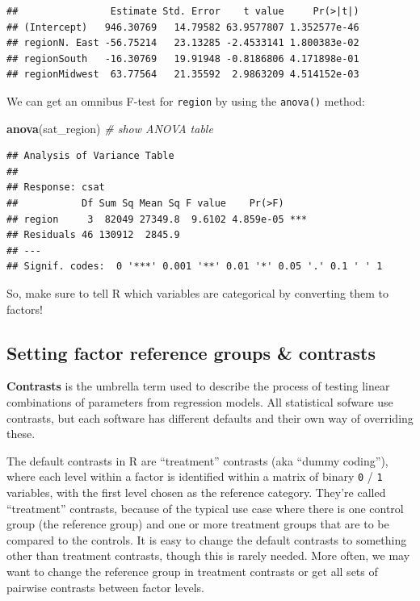 \documentclass[
]{book}
\newenvironment{Shaded}{\begin{snugshade}}{\end{snugshade}}
\newcommand{\CommentTok}[1]{\textcolor[rgb]{0.56,0.35,0.01}{\textit{#1}}}
\newcommand{\KeywordTok}[1]{\textcolor[rgb]{0.13,0.29,0.53}{\textbf{#1}}}
\newcommand{\NormalTok}[1]{#1}
\begin{document}
\begin{verbatim}
##                Estimate Std. Error    t value     Pr(>|t|)
## (Intercept)   946.30769   14.79582 63.9577807 1.352577e-46
## regionN. East -56.75214   23.13285 -2.4533141 1.800383e-02
## regionSouth   -16.30769   19.91948 -0.8186806 4.171898e-01
## regionMidwest  63.77564   21.35592  2.9863209 4.514152e-03
\end{verbatim}

We can get an omnibus F-test for \texttt{region} by using the \texttt{anova()} method:

\begin{Shaded}
\begin{Highlighting}[]
  \KeywordTok{anova}\NormalTok{(sat\_region) }\CommentTok{\# show ANOVA table}
\end{Highlighting}
\end{Shaded}

\begin{verbatim}
## Analysis of Variance Table
## 
## Response: csat
##           Df Sum Sq Mean Sq F value    Pr(>F)    
## region     3  82049 27349.8  9.6102 4.859e-05 ***
## Residuals 46 130912  2845.9                      
## ---
## Signif. codes:  0 '***' 0.001 '**' 0.01 '*' 0.05 '.' 0.1 ' ' 1
\end{verbatim}

So, make sure to tell R which variables are categorical by converting them to factors!

\hypertarget{setting-factor-reference-groups-contrasts}{%
\subsection{Setting factor reference groups \& contrasts}\label{setting-factor-reference-groups-contrasts}}

\textbf{Contrasts} is the umbrella term used to describe the process of testing linear combinations of parameters from regression models. All statistical sofware use contrasts, but each software has different defaults and their own way of overriding these.

The default contrasts in R are ``treatment'' contrasts (aka ``dummy coding''), where each level within a factor is identified within a matrix of binary \texttt{0} / \texttt{1} variables, with the first level chosen as the reference category. They're called ``treatment'' contrasts, because of the typical use case where there is one control group (the reference group) and one or more treatment groups that are to be compared to the controls. It is easy to change the default contrasts to something other than treatment contrasts, though this is rarely needed. More often, we may want to change the reference group in treatment contrasts or get all sets of pairwise contrasts between factor levels.
\end{document}
